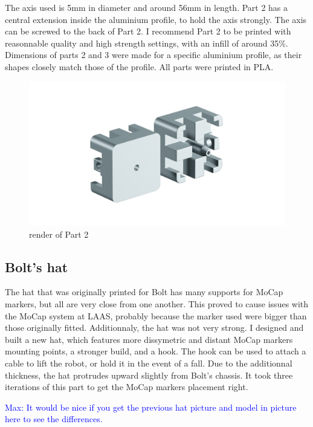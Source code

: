 \documentclass[a4paper,10pt]{article}
\newcommand{\mnaveau}[1]{\textcolor{blue}{Max: #1}}
\begin{document}
The axis used is 5mm in diameter and around 56mm in length. Part 2 has a central extension inside the aluminium profile, to hold the axis strongly. The axis can be screwed to the back of Part 2. I recommend Part 2 to be printed with reasonnable quality and high strength settings, with an infill of around 35\%. Dimensions of parts 2 and 3 were made for a specific aluminium profile, as their shapes closely match those of the profile. All parts were printed in PLA.

\begin{figure}[H]
\centering
  \includegraphics[width=\linewidth, angle=0, scale=0.8]{./images/render_stand.png}
  \caption{render of Part 2}
\end{figure}




\subsection{Bolt's hat}
The hat that was originally printed for Bolt has many supports for MoCap markers, but all are very close from one another. This proved to cause issues with the MoCap system at LAAS, probably because the marker used were bigger than those originally fitted. Additionnaly, the hat was not very strong. I designed and built a new hat, which features more dissymetric and distant MoCap markers mounting points, a stronger build, and a hook. The hook can be used to attach a cable to lift the robot, or hold it in the event of a fall. Due to the additionnal thickness, the hat protrudes upward slightly from Bolt's chassis. It took three iterations of this part to get the MoCap markers placement right.

\mnaveau{It would be nice if you get the previous hat picture and model in picture here to see the differences.}
\end{document}
